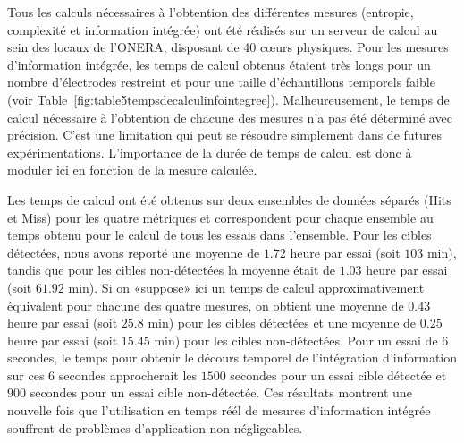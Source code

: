 Tous les calculs nécessaires à l'obtention des différentes mesures (entropie, complexité et information intégrée) ont été réalisés sur un serveur de calcul au sein des locaux de l'ONERA, disposant de 40 cœurs physiques. 
Pour les mesures d'information intégrée, les temps de calcul obtenus étaient très longs pour un nombre d'électrodes restreint et pour une taille d'échantillons temporels faible (voir Table~\ref{fig:table5tempsdecalculinfointegree}). 
Malheureusement, le temps de calcul nécessaire à l'obtention de chacune des mesures n'a pas été déterminé avec précision. 
C'est une limitation qui peut se résoudre simplement dans de futures expérimentations. 
L'importance de la durée de temps de calcul est donc à moduler ici en fonction de la mesure calculée. 

Les temps de calcul ont été obtenus sur deux ensembles de données séparés (Hits et Miss) pour les quatre métriques et correspondent pour chaque ensemble au temps obtenu pour le calcul de tous les essais dans l'ensemble. 
Pour les cibles détectées, nous avons reporté une moyenne de $1.72$ heure par essai (soit $103$ min), tandis que pour les cibles non-détectées la moyenne était de $1.03$ heure par essai (soit $61.92$ min). 
Si on «suppose» ici un temps de calcul approximativement équivalent pour chacune des quatre mesures, on obtient une moyenne de $0.43$ heure par essai (soit $25.8$ min) pour les cibles détectées et une moyenne de $0.25$ heure par essai (soit $15.45$ min) pour les cibles non-détectées. 
Pour un essai de $6$ secondes, le temps pour obtenir le décours temporel de l'intégration d'information sur ces $6$ secondes approcherait les $1500$ secondes pour un essai cible détectée et $900$ secondes pour un essai cible non-détectée. 
Ces résultats montrent une nouvelle fois que l'utilisation en temps réél de mesures d'information intégrée souffrent de problèmes d'application non-négligeables. 

